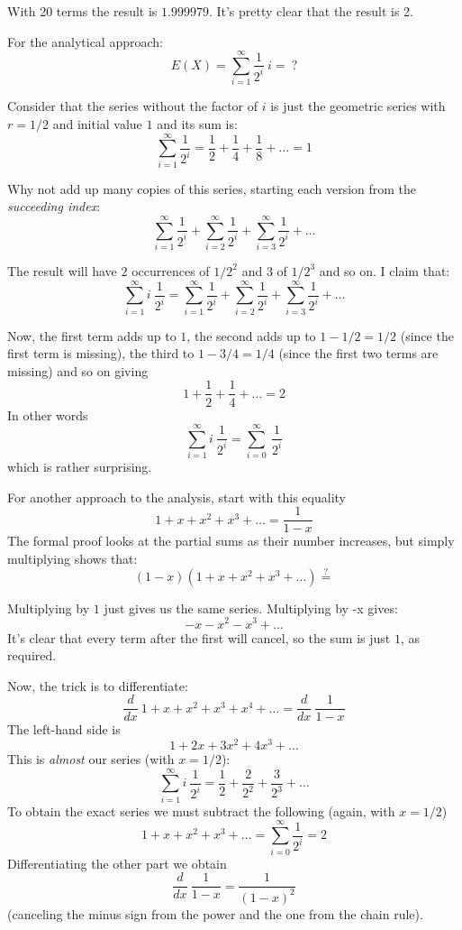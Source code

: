 \documentclass[11pt, oneside]{article}
\begin{document}
With 20 terms the result is $1.999979$.  It's pretty clear that the result is 2.

For the analytical approach:
\[ E(X) = \sum_{i=1}^{\infty} \frac{1}{2^i} \ i = \ ? \]

Consider that the series without the factor of $i$ is just the geometric series with $r=1/2$ and initial value $1$ and its sum is:
\[ \sum_{i=1}^{\infty} \frac{1}{2^i} = \frac{1}{2} + \frac{1}{4} + \frac{1}{8} + \dots = 1 \]

Why not add up many copies of this series, starting each version from the \emph{succeeding index}:
\[ \sum_{i=1}^{\infty} \frac{1}{2^i} + \sum_{i=2}^{\infty} \frac{1}{2^i} + \sum_{i=3}^{\infty} \frac{1}{2^i} + \dots \]

The result will have $2$ occurrences of $1/2^2$ and $3$ of $1/2^3$ and so on.  I claim that:
\[ \sum_{i=1}^{\infty} i \ \frac{1}{2^i}  = \sum_{i=1}^{\infty} \frac{1}{2^i} + \sum_{i=2}^{\infty} \frac{1}{2^i} + \sum_{i=3}^{\infty} \frac{1}{2^i} + \dots \]

Now, the first term adds up to $1$, the second adds up to $1 - 1/2 = 1/2$ (since the first term is missing), the third to $1 - 3/4 = 1/4$ (since the first two terms are missing) and so on giving
\[ 1 + \frac{1}{2} + \frac{1}{4} + \dots = 2 \]
In other words
\[ \sum_{i=1}^{\infty} i \ \frac{1}{2^i} = \sum_{i=0}^{\infty} \ \frac{1}{2^i} \]
which is rather surprising.

For another approach to the analysis, start with this equality
\[ 1 + x + x^2 + x^3 + \dots =  \frac{1}{1-x} \]
The formal proof looks at the partial sums as their number increases, but simply multiplying shows that:
\[ (1-x) (1 + x + x^2 + x^3 + \dots) \stackrel{?}{=} \]

Multiplying by $1$ just gives us the same series.  Multiplying by -x gives:
\[ -x - x^2 - x^3  + \dots \]
It's clear that every term after the first will cancel, so the sum is just $1$, as required.  

Now, the trick is to differentiate:
\[ \frac{d}{dx} \ 1 + x + x^2 + x^3  + x^4 + \dots = \frac{d}{dx} \ \frac{1}{1-x} \]
The left-hand side is
\[ 1 + 2x + 3x^2 + 4x^3 + \dots \]
This is \emph{almost} our series (with $x = 1/2$):
\[ \sum_{i=1}^{\infty} i \ \frac{1}{2^i} = \frac{1}{2} +  \frac{2}{2^2} +  \frac{3}{2^3}  + \dots \]
To obtain the exact series we must subtract the following (again, with $x = 1/2$)
\[ 1 + x + x^2 + x^3 + \dots = \sum_{i=0}^{\infty} \frac{1}{2^i} = 2 \]
Differentiating the other part we obtain
\[ \frac{d}{dx} \ \frac{1}{1-x} = \frac{1}{(1-x)^2} \]
(canceling the minus sign from the power and the one from the chain rule).
\end{document}
